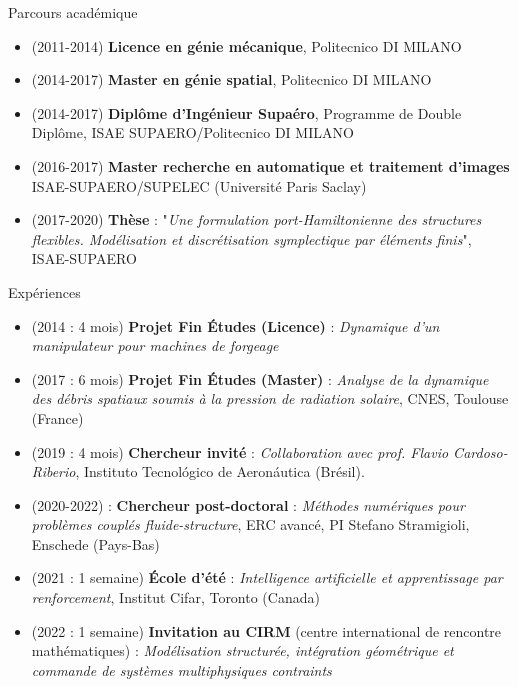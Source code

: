 \documentclass[aspectratio=169, french]{beamer}
\begin{document}
\begin{frame}{Parcours académique}
\begin{itemize}
	\item (2011-2014) \textbf{Licence en génie mécanique}, Politecnico DI MILANO
	\item (2014-2017) \textbf{Master en génie spatial}, Politecnico DI MILANO
	\item (2014-2017) \textbf{Diplôme d’Ingénieur Supaéro}, Programme de
	Double Diplôme, ISAE SUPAERO/Politecnico DI MILANO
	\item (2016-2017) \textbf{Master recherche en automatique et traitement d’images
	} ISAE-SUPAERO/SUPELEC (Université Paris Saclay)
	\item (2017-2020) \textbf{Thèse} : "\textit{Une formulation port-Hamiltonienne des structures flexibles. Modélisation et discrétisation symplectique par éléments finis}", ISAE-SUPAERO
\end{itemize}
\end{frame}

\begin{frame}{Expériences}
\begin{itemize}
\item (2014 : 4 mois) \textbf{Projet Fin Études (Licence)} : \textit{Dynamique d’un manipulateur pour machines de forgeage}
\item (2017 : 6 mois) \textbf{Projet Fin Études (Master)} : \textit{Analyse de la dynamique des débris spatiaux soumis à la pression de radiation solaire}, CNES, Toulouse (France)
\item (2019 : 4 mois) \textbf{Chercheur invité} : \textit{Collaboration avec prof. Flavio Cardoso-Riberio}, Instituto Tecnológico de Aeronáutica (Brésil).
\item (2020-2022) : \textbf{Chercheur post-doctoral} : \textit{Méthodes numériques pour problèmes couplés fluide-structure}, ERC avancé, PI Stefano Stramigioli, Enschede (Pays-Bas)
\item (2021 : 1 semaine) \textbf{École d'été} : \textit{Intelligence artificielle et apprentissage par renforcement}, Institut Cifar, Toronto (Canada)
\item (2022 : 1 semaine) \textbf{Invitation au CIRM} (centre international de rencontre mathématiques) : \textit{Modélisation structurée, intégration géométrique et commande de systèmes multiphysiques contraints}
\end{itemize}
  
\end{frame}
\end{document}
